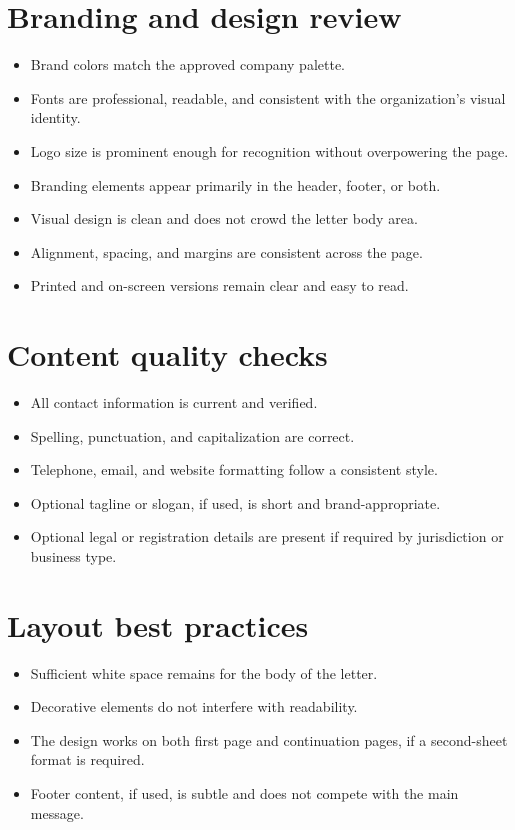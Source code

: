 \documentclass[11pt]{article}
\begin{document}
\section*{Branding and design review}
\begin{itemize}
  \item Brand colors match the approved company palette.
  \item Fonts are professional, readable, and consistent with the organization's visual identity.
  \item Logo size is prominent enough for recognition without overpowering the page.
  \item Branding elements appear primarily in the header, footer, or both.
  \item Visual design is clean and does not crowd the letter body area.
  \item Alignment, spacing, and margins are consistent across the page.
  \item Printed and on-screen versions remain clear and easy to read.
\end{itemize}

\section*{Content quality checks}
\begin{itemize}
  \item All contact information is current and verified.
  \item Spelling, punctuation, and capitalization are correct.
  \item Telephone, email, and website formatting follow a consistent style.
  \item Optional tagline or slogan, if used, is short and brand-appropriate.
  \item Optional legal or registration details are present if required by jurisdiction or business type.
\end{itemize}

\section*{Layout best practices}
\begin{itemize}
  \item Sufficient white space remains for the body of the letter.
  \item Decorative elements do not interfere with readability.
  \item The design works on both first page and continuation pages, if a second-sheet format is required.
  \item Footer content, if used, is subtle and does not compete with the main message.
\end{itemize}
\end{document}
